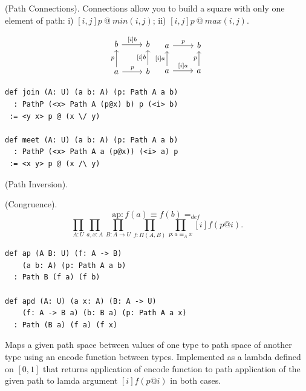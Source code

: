 \documentclass{article}
\begin{document}
\newpage

\begin{definition} (Path Connections).
Connections allow you to build a square
with only one element of path: i) $[i,j] p\ @\ min(i,j)$;
ii) $[i,j] p\ @\ max(i,j)$.

\[
\begin{array}{cc}
  \begin{tikzcd}
    b \arrow[r, "{[i]b}"] & b \\
    a \arrow[u, "p"] \arrow[r, "p"] & b \arrow[u, "{[i]b}"]
  \end{tikzcd}
  \begin{tikzcd}
    a \arrow[r, "p"] & b \\
    a \arrow[u, "{[i]a}"] \arrow[r, "{[i]a}"] & a \arrow[u, "p"]
  \end{tikzcd}
\end{array}
\]

\begin{lstlisting}[mathescape=true]
def join (A: U) (a b: A) (p: Path A a b)
  : PathP (<x> Path A (p@x) b) p (<i> b)
 := <y x> p @ (x \/ y)

def meet (A: U) (a b: A) (p: Path A a b)
  : PathP (<x> Path A a (p@x)) (<i> a) p
 := <x y> p @ (x /\ y)
\end{lstlisting}
\end{definition}

\begin{definition} (Path Inversion).
\end{definition}

\begin{theorem} (Congruence).
$$
\mathrm{ap} : f(a)\equiv f(b) =_{def}
$$
$$
  \prod_{A:U}\prod_{a,x:A}\prod_{B:A\rightarrow U}\prod_{f: \Pi(A,B)}\prod_{p:a\equiv_A x}[i] f(p@i).
$$
\begin{lstlisting}[mathescape=true]
def ap (A B: U) (f: A -> B)
    (a b: A) (p: Path A a b)
  : Path B (f a) (f b)

def apd (A: U) (a x: A) (B: A -> U)
    (f: A -> B a) (b: B a) (p: Path A a x)
  : Path (B a) (f a) (f x)
\end{lstlisting}
\end{theorem}

Maps a given path space between values of one type
to path space of another type using an encode function between types.
Implemented as a lambda defined on $[0,1]$ that returns
application of encode function to path application of
the given path to lamda argument $[i]f (p @ i)$
in both cases.
\end{document}
